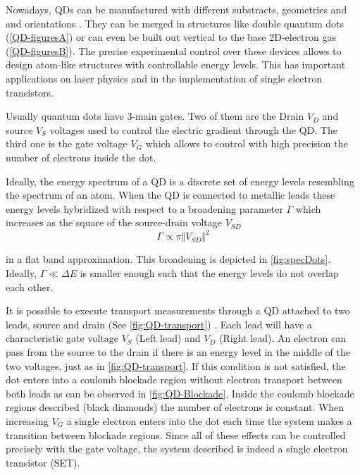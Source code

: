   Nowadays, QDs can be manufactured with different substracts, geometries and  and orientations \citep{bimberg_quantum_1999}. They can be merged in structures like double quantum dots (\ref{QD-figuresA}) or can even be built out vertical to the base 2D-electron gas (\ref{QD-figuresB}). The precise experimental control over these devices allows to design atom-like structures with controllable energy levels. This has important applications on laser physics and in the implementation of single electron transistors. 


  Usually quantum dots have $3$-main gates. Two of them are the Drain $V_D$ and source $V_S$ voltages used to control the electric gradient through the QD. The third one is the gate voltage $V_G$ which allows to control with high precision the number of electrons inside the dot. 

   Ideally, the energy spectrum of a QD is a discrete set of energy levels resembling the spectrum of an atom.  When the QD is connected to metallic leads these energy levels hybridized with respect to a broadening parameter $\Gamma$ which increases as the square of the source-drain voltage $V_{SD}$ 
\begin{equation}
    \Gamma \propto \pi \Vert V_{SD} \Vert^2
\end{equation}

in a flat band approximation. This broadening is depicted in \ref{fig:specDots}. Ideally, $\Gamma \ll \Delta E$ is smaller enough such that the energy levels do not overlap each other. 

It is possible to execute transport measurements through a QD attached to two leads, source and drain (See \ref{fig:QD-transport}) . Each lead will have a characteristic gate voltage $V_S$ (Left lead) and $V_D$ (Right lead). An electron can pass from the source to the drain if there is an energy level in the middle of the two voltages, just as in \ref{fig:QD-transport}. If this condition is not satisfied,  the dot enters into a coulomb blockade region without  electron transport between both leads as can be observed in \ref{fig:QD-Blockade}. Inside the coulomb blockade regions described (black diamonds) the number of electrons is constant. When increasing $V_G$ a single electron enters into the dot each time the system makes a transition between blockade regions. Since all of these effects can be controlled precisely with the gate voltage, the system described is indeed a single electron transistor (SET).  






